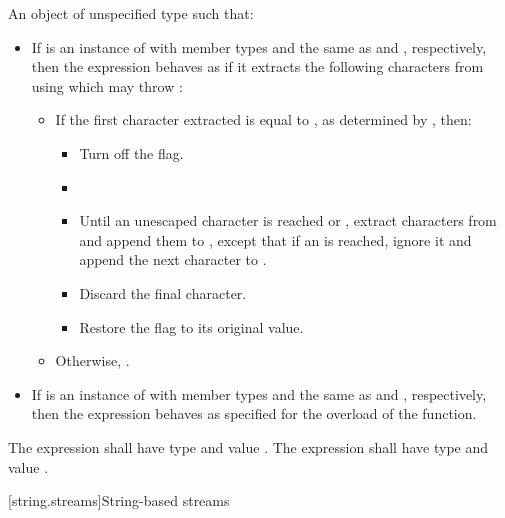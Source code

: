\begin{itemdescr}
\pnum
\returns An object of unspecified type such that:
\begin{itemize}
\item If  is an instance of  with member types
 and  the same as 
and , respectively, then the expression
 behaves as if it extracts the following
characters from  using
which may throw :
\begin{itemize}
\item If the first character extracted is equal to , as
determined by , then:
\begin{itemize}
\item Turn off the  flag.
\item {}
\item Until an unescaped  character is reached or ,
extract characters from  and append them to , except that
if an  is reached, ignore it and append the next character to
.
\item Discard the final  character.
\item Restore the  flag to its original value.
\end{itemize}
\item Otherwise, .
\end{itemize}
\item If  is an instance of  with member types
 and  the same as  and
, respectively, then the expression
 behaves as specified for the
 overload of the
 function.
\end{itemize}
The expression  shall have type
 and value . The expression
 shall have type
 and value .
\end{itemdescr}

[string.streams]{String-based streams}

